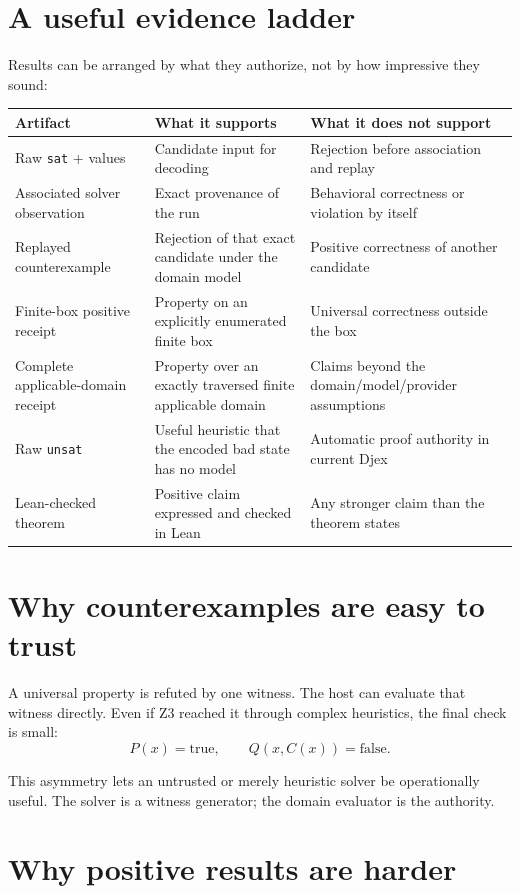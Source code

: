 \documentclass[10pt,letterpaper,oneside]{report}
\newcommand{\sat}{\texttt{sat}}
\newcommand{\unsat}{\texttt{unsat}}
\begin{document}
\section{A useful evidence ladder}

Results can be arranged by what they authorize, not by how impressive they sound:

\begin{longtable}{@{}L{0.22\textwidth}L{0.25\textwidth}L{0.47\textwidth}@{}}
\toprule
Artifact & What it supports & What it does not support \\
\midrule
\endhead
Raw \sat{} + values & Candidate input for decoding & Rejection before association and replay \\
Associated solver observation & Exact provenance of the run & Behavioral correctness or violation by itself \\
Replayed counterexample & Rejection of that exact candidate under the domain model & Positive correctness of another candidate \\
Finite-box positive receipt & Property on an explicitly enumerated finite box & Universal correctness outside the box \\
Complete applicable-domain receipt & Property over an exactly traversed finite applicable domain & Claims beyond the domain/model/provider assumptions \\
Raw \unsat{} & Useful heuristic that the encoded bad state has no model & Automatic proof authority in current Djex \\
Lean-checked theorem & Positive claim expressed and checked in Lean & Any stronger claim than the theorem states \\
\bottomrule
\end{longtable}

\section{Why counterexamples are easy to trust}

A universal property is refuted by one witness. The host can evaluate that witness directly. Even if Z3 reached it through complex heuristics, the final check is small:
\[
  P(x)=\text{true},\qquad Q(x,C(x))=\text{false}.
\]

This asymmetry lets an untrusted or merely heuristic solver be operationally useful. The solver is a witness generator; the domain evaluator is the authority.

\section{Why positive results are harder}
\end{document}
